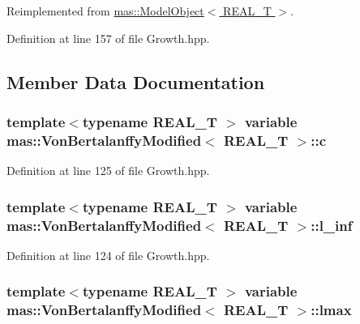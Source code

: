 Reimplemented from \hyperlink{structmas_1_1_model_object_a8eaf6c7c52e42ea8869aefa318358cb5}{mas\-::\-Model\-Object$<$ R\-E\-A\-L\-\_\-\-T $>$}.



Definition at line 157 of file Growth.\-hpp.



\subsection{Member Data Documentation}
\hypertarget{structmas_1_1_von_bertalanffy_modified_ac1ceb4a5dc583de01c35054eb5034f1d}{
\subsubsection[{c}]{\setlength{\rightskip}{0pt plus 5cm}template$<$typename R\-E\-A\-L\-\_\-\-T $>$ {\bf variable} {\bf mas\-::\-Von\-Bertalanffy\-Modified}$<$ R\-E\-A\-L\-\_\-\-T $>$\-::c}}\label{structmas_1_1_von_bertalanffy_modified_ac1ceb4a5dc583de01c35054eb5034f1d}


Definition at line 125 of file Growth.\-hpp.

\hypertarget{structmas_1_1_von_bertalanffy_modified_a474caebe2c9277303d7bdba03101432c}{
\subsubsection[{l\-\_\-inf}]{\setlength{\rightskip}{0pt plus 5cm}template$<$typename R\-E\-A\-L\-\_\-\-T $>$ {\bf variable} {\bf mas\-::\-Von\-Bertalanffy\-Modified}$<$ R\-E\-A\-L\-\_\-\-T $>$\-::l\-\_\-inf}}\label{structmas_1_1_von_bertalanffy_modified_a474caebe2c9277303d7bdba03101432c}


Definition at line 124 of file Growth.\-hpp.

\hypertarget{structmas_1_1_von_bertalanffy_modified_a841b52d7c02054bb25516558f192a092}{
\subsubsection[{lmax}]{\setlength{\rightskip}{0pt plus 5cm}template$<$typename R\-E\-A\-L\-\_\-\-T $>$ {\bf variable} {\bf mas\-::\-Von\-Bertalanffy\-Modified}$<$ R\-E\-A\-L\-\_\-\-T $>$\-::lmax}}\label{structmas_1_1_von_bertalanffy_modified_a841b52d7c02054bb25516558f192a092}


